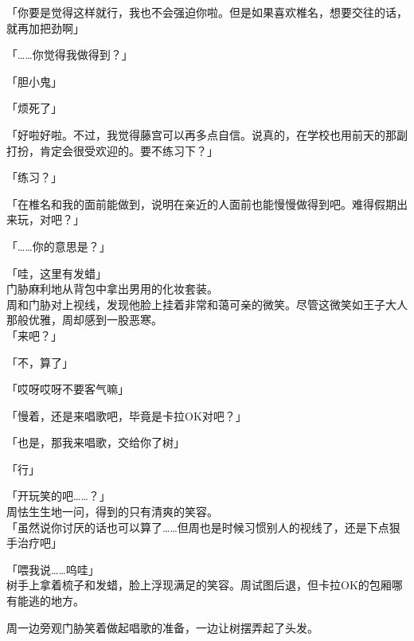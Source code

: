 「你要是觉得这样就行，我也不会强迫你啦。但是如果喜欢椎名，想要交往的话，就再加把劲啊」

「……你觉得我做得到？」

「胆小鬼」

「烦死了」

「好啦好啦。不过，我觉得藤宫可以再多点自信。说真的，在学校也用前天的那副打扮，肯定会很受欢迎的。要不练习下？」

「练习？」

「在椎名和我的面前能做到，说明在亲近的人面前也能慢慢做得到吧。难得假期出来玩，对吧？」

「……你的意思是？」

「哇，这里有发蜡」\\

门胁麻利地从背包中拿出男用的化妆套装。\\

周和门胁对上视线，发现他脸上挂着非常和蔼可亲的微笑。尽管这微笑如王子大人那般优雅，周却感到一股恶寒。\\

「来吧？」

「不，算了」

「哎呀哎呀不要客气嘛」

「慢着，还是来唱歌吧，毕竟是卡拉OK对吧？」

「也是，那我来唱歌，交给你了树」

「行」

「开玩笑的吧……？」\\

周怯生生地一问，得到的只有清爽的笑容。\\

「虽然说你讨厌的话也可以算了……但周也是时候习惯别人的视线了，还是下点狠手治疗吧」

「喂我说……呜哇」\\

树手上拿着梳子和发蜡，脸上浮现满足的笑容。周试图后退，但卡拉OK的包厢哪有能逃的地方。

周一边旁观门胁笑着做起唱歌的准备，一边让树摆弄起了头发。
